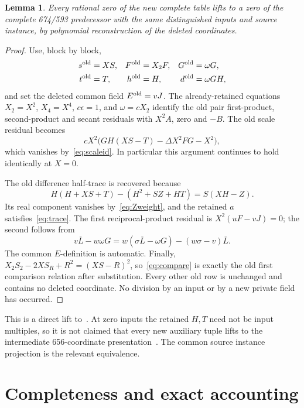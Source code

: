 \documentclass[11pt]{article}
\newtheorem{lemma}[theorem]{Lemma}
\begin{document}
\begin{lemma}\label{lem:lift}
Every rational zero of the new complete table lifts to a zero of the
complete 674/593 predecessor with the same distinguished inputs and
source instance, by polynomial reconstruction of the deleted coordinates.
\end{lemma}
\begin{proof}
Use, block by block,
\begin{align*}
 s^{\rm old}&=XS,& F^{\rm old}&=X_2F,&
 G^{\rm old}&=\omega G,\\
 t^{\rm old}&=T,& h^{\rm old}&=H,&
 d^{\rm old}&=\omega GH,
\end{align*}
and set the deleted common field \(E^{\rm old}=vJ\).
The already-retained equations \(X_2=X^2\), \(X_4=X^4\),
\(c\epsilon=1\), and \(\omega=cX_2\) identify the old pair
first-product, second-product and secant residuals with \(X^2A\),
zero and \(-B\). The old scale residual becomes
\[
 cX^2\bigl(GH(XS-T)-\Delta X^2FG-X^2\bigr),
\]
which vanishes by~\eqref{eq:scaleid}. In particular this argument
continues to hold identically at \(X=0\).

The old difference half-trace is recovered because
\[
 H(H+XS+T)-(H^2+SZ+HT)=S(XH-Z).
\]
Its real component vanishes by~\eqref{eq:Zweight}, and the retained
\(a\) satisfies~\eqref{eq:trace}. The first reciprocal-product
residual is \(X^2(uF-vJ)=0\); the second follows from
\[
 v\overline L-w\omega G
       =w(\sigma\overline L-\omega G)-(w\sigma-v)\overline L.
\]
The common \(E\)-definition is automatic. Finally,
\(X_2S_2-2XS_R+R^2=(XS-R)^2\), so~\eqref{eq:compare}
is exactly the old first comparison relation after substitution.
Every other old row is unchanged and contains no deleted coordinate.
No division by an input or by a new private field has occurred.
\end{proof}

This is a direct lift to~\cite{odd}. At zero inputs the retained
\(H,T\) need not be input multiples, so it is not claimed that every
new auxiliary tuple lifts to the intermediate 656-coordinate
presentation~\cite{unscaled}. The common source instance projection
is the relevant equivalence.

\section{Completeness and exact accounting}
\end{document}
